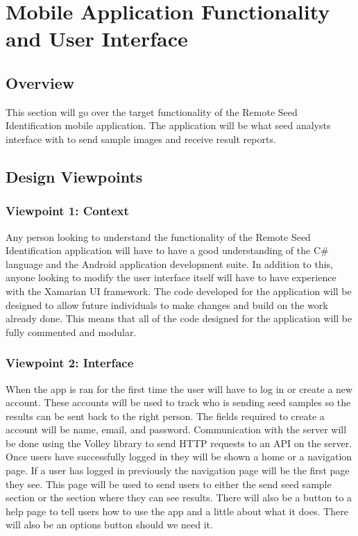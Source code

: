 \documentclass[onecolumn, draftclsnofoot,10pt, compsoc]{IEEEtran}
\begin{document}
\newpage
\section{Mobile Application Functionality and User Interface}
	\subsection{Overview}
		This section will go over the target functionality of the Remote Seed Identification mobile application. The application will be what seed analysts interface with to send sample images and receive result reports. 
	\subsection{Design Viewpoints}
    	\subsubsection{Viewpoint 1: Context}
        	Any person looking to understand the functionality of the Remote Seed Identification application will have to have a good understanding of the C\# language and the Android application development suite. In addition to this, anyone looking to modify the user interface itself will have to have experience with the Xamarian UI framework. The code developed for the application will be designed to allow future individuals to make changes and build on the work already done. This means that all of the code designed for the application will be fully commented and modular. 
        \subsubsection{Viewpoint 2: Interface}
        	When the app is ran for the first time the user will have to log in or create a new account.
		    These accounts will be used to track who is sending seed samples so the results can be sent back to the right person.
		    The fields required to create a account will be name, email, and password.
    		Communication with the server will be done using the Volley library to send HTTP requests to an API on the server.
    		Once users have successfully logged in they will be shown a home or a navigation page.
    		If a user has logged in previously the navigation page will be the first page they see.
		    This page will be used to send users to either the send seed sample section or the section where they can see results.
		    There will also be a button to a help page to tell users how to use the app and a little about what it does.
		    There will also be an options button should we need it.
            
\end{document}
